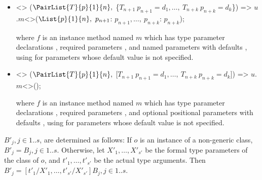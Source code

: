 \documentclass[makeidx]{article}
\begin{document}
{\begin{itemize}
\item
\begin{normativeDartCode}
<>
($\PairList{T}{p}{1}{n},\ $\{$T_{n+1}\ p_{n+1} = d_1, \ldots,\ T_{n+k}\ p_{n+k} = d_k$\}) =>
\quad$u$.$m$<>($\List{p}{1}{n},\ p_{n+1}$: $p_{n+1}, \ldots,\ p_{n+k}$: $p_{n+k}$);
\end{normativeDartCode}
where $f$ is an instance method named $m$
which has type parameter declarations
\TypeParametersStd,
required parameters ,
and named parameters  with defaults ,
using  for parameters whose default value is not specified.
\item
\begin{normativeDartCode}
<>
($\PairList{T}{p}{1}{n},\ $[$T_{n+1}\ p_{n+1} = d_1, \ldots,\ T_{n+k}\ p_{n+k} = d_k$]) =>
\quad$u$.$m$<>();
\end{normativeDartCode}
where $f$ is an instance method named $m$
which has type parameter declarations
\TypeParametersStd,
required parameters ,
and optional positional parameters
 with defaults ,
using  for parameters whose default value is not specified.
\end{itemize}

\LMHash{}%
$B'_j, j \in 1 .. s$, are determined as follows:
If $o$ is an instance of a non-generic class, $B'_j = B_j, j \in 1 .. s$.
Otherwise, let $X'_1, \ldots, X'_{s'}$ be
the formal type parameters of the class of $o$,
and $t'_1, \ldots, t'_{s'}$ be the actual type arguments.
Then $B'_j = [t'_1/X'_1, \ldots, t'_{s'}/X'_{s'}]B_j, j \in 1 .. s$.


}
\end{document}
